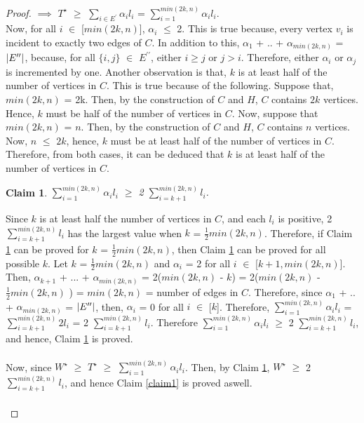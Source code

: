\documentclass[12pt]{article}
\newtheorem{claim}{Claim}
\numberwithin{equation}{subsection}
\numberwithin{table}{subsection}
\numberwithin{algorithm}{subsection}
\begin{document}
\begin{proof}
$\implies$ $T^\star$ $\geq$ $\sum_{i \in E^\prime} \alpha_i l_i$ = $\sum_{i =1}^{min(2k, n)} \alpha_i l_i$.\\ Now, for all $i$ $\in$ [$min(2k, n)$], $\alpha_i$ $\leq$ 2. This is true because, every vertex $v_i$ is incident to exactly two edges of $C$. In addition to this, $\alpha_1$ + .. + $\alpha_{min(2k, n)}$ = $\abs{E^{\prime\prime}}$, because, for all $\{i,j\}$ $\in$ $E^{\prime\prime}$, either $ i \geq j$ or $j > i$. Therefore, either $\alpha_i$ or $\alpha_j$ is incremented by one. Another observation is that, $k$ is at least half of the number of vertices in $C$. This is true because of the following. Suppose that, $min(2k, n)$ = 2k. Then, by the construction of $C$ and $H$, $C$ contains $2k$ vertices. Hence, $k$ must be half of the number of vertices in $C$. Now, suppose that $min(2k, n)$ = $n$. Then, by the construction of $C$ and $H$, $C$ contains $n$ vertices. Now, $n$ $\leq$ $2k$, hence, $k$ must be at least half of the number of vertices in $C$. Therefore, from both cases, it can be deduced that $k$ is at least half of the number of vertices in $C$.
\begin{claim}
\label{claim2}
$\sum_{i =1}^{min(2k, n)} \alpha_i l_i$ $\geq$ 2 $\sum_{i = k + 1}^{min(2k, n)} l_i$.
\end{claim}
Since $k$ is at least half the number of vertices in $C$, and each $l_i$ is positive, 2 $\sum_{i = k + 1}^{min(2k, n)} l_i$ has the largest value when $k$ = $\frac{1}{2} min(2k, n)$. Therefore, if Claim \ref{claim2} can be proved for $k$ = $\frac{1}{2} min(2k, n)$, then Claim \ref{claim2} can be proved for all possible $k$. Let $k$ = $\frac{1}{2} min(2k, n)$ and $\alpha_i$ = 2 for all $i$ $\in$ [$k+1,min(2k, n)$]. Then, $\alpha_{k+1}$ + ... + $\alpha_{min(2k, n)}$ = 2($min(2k, n)$ - $k$) = 2($min(2k, n)$ -  $\frac{1}{2} min(2k, n)$ ) =  $min(2k, n)$ = number of edges in $C$. Therefore, since $\alpha_1$ + .. + $\alpha_{min(2k, n)}$ = $\abs{E^{\prime\prime}}$, then, $\alpha_i$ = 0 for all $i$ $\in$ [$k$]. Therefore, $\sum_{i =1}^{min(2k, n)} \alpha_i l_i$ = $\sum_{i = k + 1}^{min(2k, n)}2 l_i$ = 2 $\sum_{i = k + 1}^{min(2k, n)} l_i$. Therefore $\sum_{i =1}^{min(2k, n)} \alpha_i l_i$ $\geq$ 2 $\sum_{i = k + 1}^{min(2k, n)} l_i$, and hence, Claim \ref{claim2} is proved.\\\\
Now, since $W^\star$ $\geq$ $T^\star$ $\geq$ $\sum_{i =1}^{min(2k, n)} \alpha_i l_i$. Then, by Claim \ref{claim2}, $W^\star$  $\geq$ 2 $\sum_{i = k + 1}^{min(2k, n)} l_i$, and hence Claim \ref{claim1} is proved aswell.\\\\

\end{proof}
\end{document}
